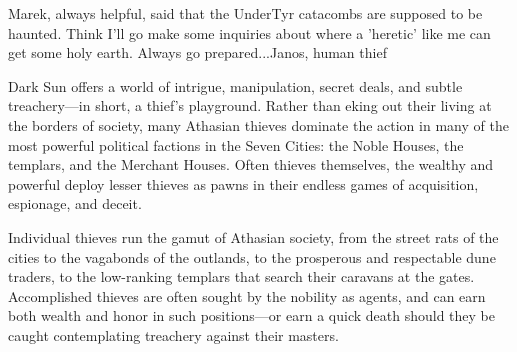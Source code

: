 {Marek, always helpful, said that the UnderTyr catacombs are supposed to be haunted. Think I'll go make some inquiries about where a 'heretic' like me can get some holy earth. Always go prepared...}{Janos, human thief}

{\tableheader Dark Sun} offers a world of intrigue, manipulation, secret deals, and subtle treachery---in short, a thief's playground. Rather than eking out their living at the
borders of society, many Athasian thieves dominate the action in many of the most powerful political factions in the Seven Cities: the Noble Houses, the templars, and the Merchant Houses. Often thieves themselves, the wealthy and powerful deploy lesser thieves as pawns in their endless games of acquisition, espionage, and deceit.

Individual thieves run the gamut of Athasian society, from the street rats of the cities to the vagabonds of the outlands, to the prosperous and respectable dune traders, to the low-ranking templars that search their caravans at the gates. Accomplished thieves are often sought by the nobility as agents, and can earn both wealth and honor in such positions---or earn a quick death should they be caught contemplating treachery against their masters.

